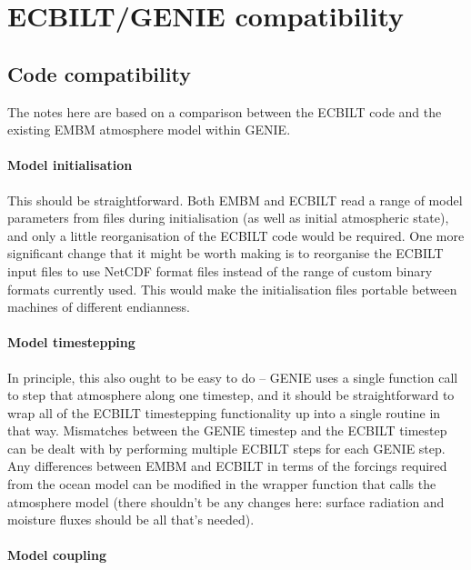 \documentclass[a4paper,11pt]{article}
\begin{document}
\section{ECBILT/GENIE compatibility}

\subsection{Code compatibility}

The notes here are based on a comparison between the ECBILT code and
the existing EMBM atmosphere model within GENIE.

\paragraph{Model initialisation}

This should be straightforward.  Both EMBM and ECBILT read a range of
model parameters from files during initialisation (as well as initial
atmospheric state), and only a little reorganisation of the ECBILT
code would be required.  One more significant change that it might be
worth making is to reorganise the ECBILT input files to use NetCDF
format files instead of the range of custom binary formats currently
used.  This would make the initialisation files portable between
machines of different endianness.

\paragraph{Model timestepping}

In principle, this also ought to be easy to do -- GENIE uses a single
function call to step that atmosphere along one timestep, and it
should be straightforward to wrap all of the ECBILT timestepping
functionality up into a single routine in that way.  Mismatches
between the GENIE timestep and the ECBILT timestep can be dealt with
by performing multiple ECBILT steps for each GENIE step.  Any
differences between EMBM and ECBILT in terms of the forcings required
from the ocean model can be modified in the wrapper function that
calls the atmosphere model (there shouldn't be any changes here:
surface radiation and moisture fluxes should be all that's needed).

\paragraph{Model coupling}
\end{document}

